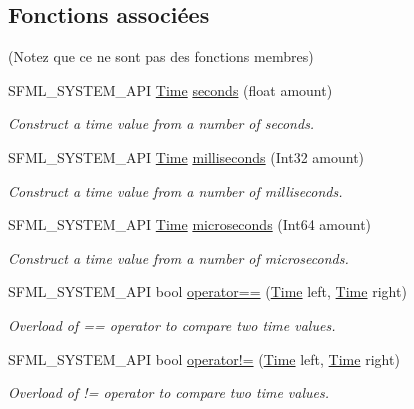 \subsection*{Fonctions associées}
(Notez que ce ne sont pas des fonctions membres) \begin{DoxyCompactItemize}
\item 
S\+F\+M\+L\+\_\+\+S\+Y\+S\+T\+E\+M\+\_\+\+A\+PI \hyperlink{classsf_1_1Time}{Time} \hyperlink{classsf_1_1Time_ae36b9ef700f0ed0516abf0194ceb546b}{seconds} (float amount)
\begin{DoxyCompactList}\small\item\em Construct a time value from a number of seconds. \end{DoxyCompactList}\item 
S\+F\+M\+L\+\_\+\+S\+Y\+S\+T\+E\+M\+\_\+\+A\+PI \hyperlink{classsf_1_1Time}{Time} \hyperlink{classsf_1_1Time_ae379d420bc07170668f51522023957b9}{milliseconds} (Int32 amount)
\begin{DoxyCompactList}\small\item\em Construct a time value from a number of milliseconds. \end{DoxyCompactList}\item 
S\+F\+M\+L\+\_\+\+S\+Y\+S\+T\+E\+M\+\_\+\+A\+PI \hyperlink{classsf_1_1Time}{Time} \hyperlink{classsf_1_1Time_a951fd7219641f1e8191887f5dfe0dc31}{microseconds} (Int64 amount)
\begin{DoxyCompactList}\small\item\em Construct a time value from a number of microseconds. \end{DoxyCompactList}\item 
S\+F\+M\+L\+\_\+\+S\+Y\+S\+T\+E\+M\+\_\+\+A\+PI bool \hyperlink{classsf_1_1Time_a2b8453227f651e9d5db3663fa08c47e2}{operator==} (\hyperlink{classsf_1_1Time}{Time} left, \hyperlink{classsf_1_1Time}{Time} right)
\begin{DoxyCompactList}\small\item\em Overload of == operator to compare two time values. \end{DoxyCompactList}\item 
S\+F\+M\+L\+\_\+\+S\+Y\+S\+T\+E\+M\+\_\+\+A\+PI bool \hyperlink{classsf_1_1Time_ae06b561f6422ec8ca414d400efd2cf4b}{operator!=} (\hyperlink{classsf_1_1Time}{Time} left, \hyperlink{classsf_1_1Time}{Time} right)
\begin{DoxyCompactList}\small\item\em Overload of != operator to compare two time values. \end{DoxyCompactList}\item 

\end{DoxyCompactItemize}
